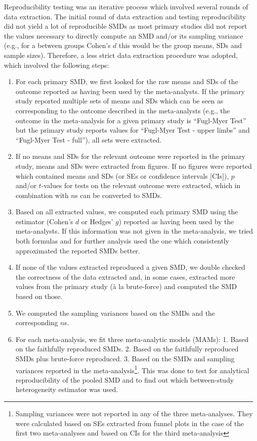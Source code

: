 \documentclass[
  man,floatsintext]{apa6}
\providecommand{\tightlist}{%
  \setlength{\itemsep}{0pt}\setlength{\parskip}{0pt}}
\begin{document}
Reproducibility testing was an iterative process which involved several rounds of data extraction. The initial round of data extraction and testing reproducibility did not yield a lot of reproducible SMDs as most primary studies did not report the values necessary to directly compute an SMD and/or its sampling variance (e.g., for a between groups Cohen's \(d\) this would be the group means, SDs and sample sizes). Therefore, a less strict data extraction procedure was adopted, which involved the following steps:

\begin{enumerate}
\def\labelenumi{\arabic{enumi}.}
\tightlist
\item
  For each primary SMD, we first looked for the raw means and SDs of the outcome reported as having been used by the meta-analysts. If the primary study reported multiple sets of means and SDs which can be seen as corresponding to the outcome described in the meta-analysts (e.g., the outcome in the meta-analysis for a given primary study is ``Fugl-Myer Test'' but the primary study reports values for ``Fugl-Myer Test - upper limbs'' and ``Fugl-Myer Test - full''), all sets were extracted.
\item
  If no means and SDs for the relevant outcome were reported in the primary study, means and SDs were extracted from figures. If no figures were reported which contained means and SDs (or SEs or confidence intervals {[}CIs{]}), \(p\) and/or \(t\)-values for tests on the relevant outcome were extracted, which in combination with \(n\)s can be converted to SMDs.
\item
  Based on all extracted values, we computed each primary SMD using the estimator (Cohen's \(d\) or Hedges' \(g\)) reported as having been used by the meta-analysts. If this information was not given in the meta-analysis, we tried both formulas and for further analysis used the one which consistently approximated the reported SMDs better.
\item
  If none of the values extracted reproduced a given SMD, we double checked the correctness of the data extracted and, in some cases, extracted more values from the primary study (à la brute-force) and computed the SMD based on those.
\item
  We computed the sampling variances based on the SMDs and the corresponding \(n\)s.
\item
  For each meta-analysis, we fit three meta-analytic models (MAMs): 1. Based on the faithfully reproduced SMDs. 2. Based on the faithfully reproduced SMDs plus brute-force reproduced. 3. Based on the SMDs and sampling variances reported in the meta-analysis\footnote{Sampling variances were not reported in any of the three meta-analyses. They were calculated based on SEs extracted from funnel plots in the case of the first two meta-analyses and based on CIs for the third meta-analysis}. This was done to test for analytical reproducibility of the pooled SMD and to find out which between-study heterogeneity estimator was used.
\end{enumerate}
\end{document}
